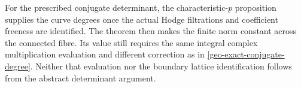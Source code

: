 For the prescribed conjugate determinant, the characteristic-$p$
proposition supplies the curve degrees once the actual Hodge
filtrations and coefficient freeness are identified. The theorem
then makes the finite norm constant across the connected fibre.
Its value still requires the same integral complex multiplication
evaluation and different correction as in
\eqref{geo-exact-conjugate-degree}. Neither that evaluation nor
the boundary lattice identification follows from the abstract
determinant argument.
